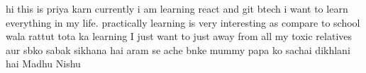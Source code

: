 hi this is priya karn
currently i am learning react and git
btech 
i want to learn everything in my life. practically learning is very interesting as compare to school wala rattut tota ka learning
I just want to just away from all my toxic relatives aur sbko sabak sikhana hai aram se ache bnke mummy papa ko sachai dikhlani hai
Madhu 
Nishu
